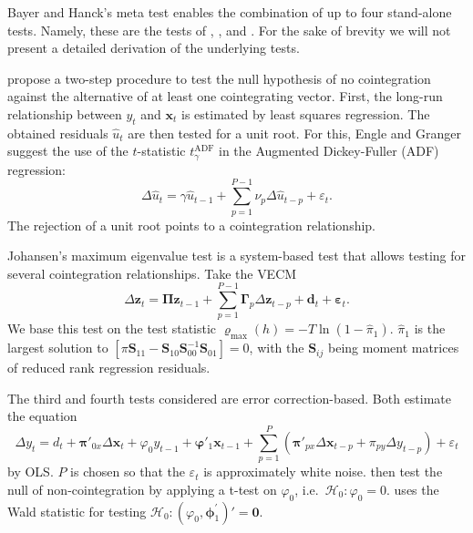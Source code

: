 \documentclass[12pt,a4paper]{article}
\begin{document}
Bayer and Hanck's meta test enables the combination of up to four
stand-alone tests. Namely, these are the tests of
\textcite{Englegranger_1987}, \textcite{Johansen_1988},
\textcite{Boswijk_1994} and \textcite{Banerjee_1998}. For the sake of
brevity we will not present a detailed derivation of the underlying
tests.

\textcite{Englegranger_1987} propose a two-step procedure to test the
null hypothesis of no cointegration against the alternative of at least
one cointegrating vector. First, the long-run relationship between
\(y_t\) and \(\mathbf{x}_t\) is estimated by least squares regression.
The obtained residuals \(\hat{u}_t\) are then tested for a unit root.
For this, Engle and Granger suggest the use of the \(t\)-statistic
\(t^{\text{ADF}}_\gamma\) in the Augmented Dickey-Fuller (ADF)
regression: \begin{equation}
\Delta \hat{u}_t = \gamma \hat{u}_{t-1} + \sum^{P-1}_{p=1} \nu_p \Delta \hat{u}_{t-p} + \varepsilon_t.
\label{eq:2}
\end{equation} The rejection of a unit root points to a cointegration
relationship.

Johansen's \autocite*{Johansen_1988} maximum eigenvalue test is a
system-based test that allows testing for several cointegration
relationships. Take the \ac{VECM} \begin{equation}
\Delta \mathbf{z}_t = \mathbf{\Pi z}_{t-1} + \sum^{P-1}_{p = 1} \mathbf{\Gamma}_p \Delta \mathbf{z}_{t-p} + \mathbf{d}_t + \mathbf{\varepsilon}_t.
\label{eq:3}
\end{equation} We base this test on the test statistic
\(\varrho_{\text{max}}(h) = -T \ln(1 - \hat{\pi}_1)\). \(\hat{\pi}_1\)
is the largest solution to
\([\pi \mathbf{S}_{11} - \mathbf{S}_{10} \mathbf{S}_{00}^{-1}\mathbf{S}_{01}] = 0\),
with the \(\mathbf{S}_{ij}\) being moment matrices of reduced rank
regression residuals.

The third and fourth tests considered are error correction-based. Both
estimate the equation \begin{equation}
\Delta y_t = d_t + \bm{\pi}'_{0x} \Delta \mathbf{x}_t + \varphi_0 y_{t-1} + \bm{\varphi}'_1 \mathbf{x}_{t-1} + \sum^P_{p=1} (\bm{\pi}'_{px} \Delta \mathbf{x}_{t-p} + \pi_{py} \Delta y_{t-p}) + \varepsilon_t
\label{eq:4}
\end{equation} by \ac{OLS}. \(P\) is chosen so that the
\(\varepsilon_t\) is approximately white noise. \textcite{Banerjee_1998}
then test the null of non-cointegration by applying a t-test on
\(\varphi_0\), i.e.~\(\mathcal{H}_0 : \varphi_0 = 0\).
\textcite{Boswijk_1994} uses the Wald statistic for testing
\(\mathcal{H}_0 : (\varphi_0, \bm{\phi}^{'}_1)' = \mathbf{0}\).
\end{document}
